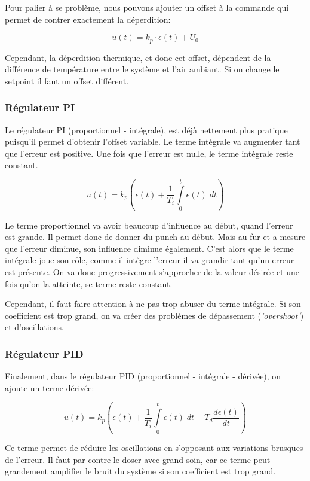 Pour palier à se problème, nous pouvons ajouter un offset à la 
commande qui permet de contrer exactement la déperdition:

$$u(t) = k_p \cdot \epsilon(t) + U_0$$

Cependant, la déperdition thermique, et donc cet offset, dépendent 
de la différence de température entre le système et l'air ambiant.
Si on change le setpoint il faut un offset différent. 


\subsubsection{Régulateur PI}
Le régulateur PI (proportionnel - intégrale), est déjà nettement plus pratique
puisqu'il permet d'obtenir l'offset variable. Le terme intégrale va augmenter 
tant que l'erreur est positive. Une fois que l'erreur est nulle, 
le terme intégrale reste constant. 

$$u(t) = k_p \left( \epsilon(t) + \frac{1}{T_i} \int \limits_0^t \epsilon(t) \; dt \right)$$

Le terme proportionnel va avoir beaucoup d'influence
au début, quand l'erreur est grande. Il permet donc de donner du punch au début.
Mais au fur et a mesure que l'erreur diminue, son influence diminue également.
C'est alors que le terme intégrale joue son rôle, comme il intègre l'erreur
il va grandir tant qu'un erreur est présente. On va donc progressivement
s'approcher de la valeur désirée et une fois qu'on la atteinte, se terme
reste constant.

Cependant, il faut faire attention à ne pas trop abuser du terme intégrale.
Si son coefficient est trop grand, on va créer des problèmes de dépassement
(\textit{'overshoot'}) et d'oscillations.

\subsubsection{Régulateur PID}
Finalement, dans le régulateur PID (proportionnel - intégrale - dérivée), on 
ajoute un terme dérivée:

$$u(t) = k_p \left( \epsilon(t) + \frac{1}{T_i} \int \limits_0^t \epsilon(t) \; dt + T_d \frac{d\epsilon(t)}{dt} \right)$$

Ce terme permet de réduire les oscillations en s'opposant aux variations
brusques de l'erreur. Il faut par contre le doser avec grand soin, car ce
terme peut grandement amplifier le bruit du système si son coefficient est
trop grand. 

